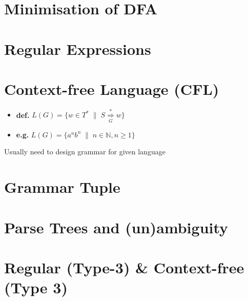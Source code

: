 \documentclass[10pt,a4paper,landscape]{article}
\newcommand{\derive}[2]{\overset{#1}{\underset{#2}{\Rightarrow}}}
\begin{document}
\begin{multicols*}{3}
\section*{Minimisation of DFA}

\section*{Regular Expressions}

\section*{Context-free Language (CFL)}
\begin{itemize}
\item \textbf{def.} \(L(G) = \{w \in T^{*} \;\|\; S \derive{*}{G} w\}\)
\item \textbf{e.g.} \(L(G) = \{a^{n}b^{n} \;\|\; n \in \mathbb{N}, n \geq 1\}\)
\end{itemize}
Usually need to design grammar for given language

\section*{Grammar Tuple}


\section*{Parse Trees and (un)ambiguity}
% 

\section*{Regular (Type-3) \& Context-free (Type 3)}



\end{multicols*}
\end{document}
